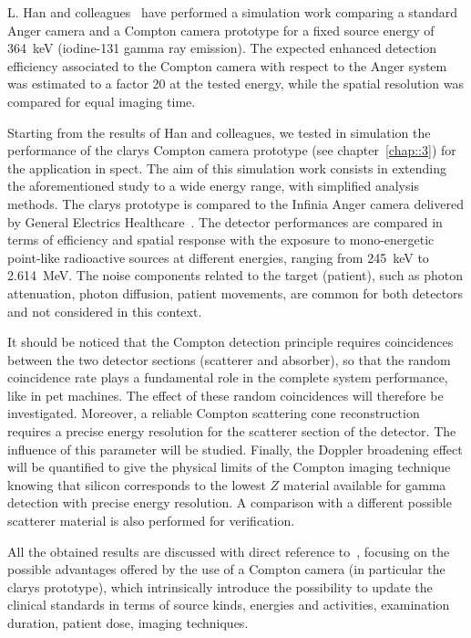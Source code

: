 L. Han and colleagues~\parencite{Han2008} have performed a simulation work comparing a standard Anger camera and a Compton camera prototype for a fixed source energy of 364~keV (iodine-131 gamma ray emission). The expected enhanced detection efficiency associated to the Compton camera with respect to the Anger system was estimated to a factor 20 at the tested energy, while the spatial resolution was compared for equal imaging time. 

Starting from the results of Han and colleagues, we tested in simulation the performance of the \gls{clarys} Compton camera prototype (see chapter~\ref{chap::3}) for the application in \gls{spect}. The aim of this simulation work consists in extending the aforementioned study to a wide energy range, with simplified analysis methods. The \gls{clarys} prototype is compared to the Infinia Anger camera delivered by General Electrics Healthcare~\parencite{GeneralElectrics2006}. The detector performances are compared in terms of efficiency and spatial response with the exposure to mono-energetic point-like radioactive sources at different energies, ranging from 245~keV to 2.614~MeV. The noise components related to the target (patient), such as photon attenuation, photon diffusion, patient movements, are common for both detectors and not considered in this context.

It should be noticed that the Compton detection principle requires coincidences between the two detector sections (scatterer and absorber), so that the random coincidence rate plays a fundamental role in the complete system performance, like in \gls{pet} machines. The effect of these random coincidences will therefore be investigated. Moreover, a reliable Compton scattering cone reconstruction requires a precise energy resolution for the scatterer section of the detector. The influence of this parameter will be studied. Finally, the Doppler broadening effect will be quantified to give the physical limits of the Compton imaging technique knowing that silicon corresponds to the lowest $Z$ material available for gamma detection with precise energy resolution. A comparison with a different possible scatterer material is also performed for verification.

All the obtained results are discussed with direct reference to~\parencite{Han2008}, focusing on the possible advantages offered by the use of a Compton camera (in particular the \gls{clarys} prototype), which intrinsically introduce the possibility to update the clinical standards in terms of source kinds, energies and activities, examination duration, patient dose, imaging techniques.


